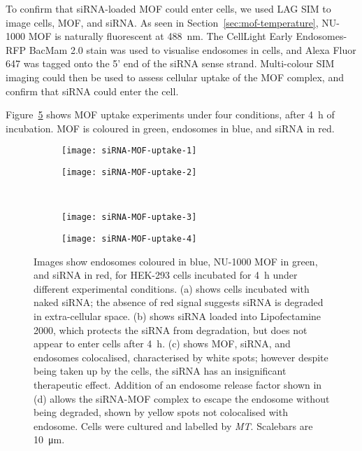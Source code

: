 To confirm that siRNA-loaded MOF could enter cells, we used LAG SIM to image cells, MOF, and siRNA. 
As seen in Section~\ref{sec:mof-temperature}, NU-1000 MOF is naturally fluorescent at \SI{488}{\nano\metre}. 
The CellLight Early Endosomes-RFP BacMam 2.0 stain was used to visualise endosomes in cells, and Alexa Fluor 647 was tagged onto the 5' end of the siRNA sense strand. 
Multi-colour SIM imaging could then be used to assess cellular uptake of the MOF complex, and confirm that siRNA could enter the cell. 

Figure~\ref{fig:siRNA-MOF-uptake} shows MOF uptake experiments under four conditions, after \SI{4}{\hour} of incubation. 
MOF is coloured in green, endosomes in blue, and siRNA in red. 


\begin{figure}[tbp]
\centering
\begin{subfigure}[b]{0.49\textwidth}
	\texttt{[image: siRNA-MOF-uptake-1]}
	\caption{}\label{fig:siRNA-MOF-uptake-1}
\end{subfigure}
\hfill
\begin{subfigure}[b]{0.49\textwidth}
	\texttt{[image: siRNA-MOF-uptake-2]}
	\caption{}\label{fig:siRNA-MOF-uptake-2}
\end{subfigure}

~\newline
\begin{subfigure}[b]{0.49\textwidth}
	\texttt{[image: siRNA-MOF-uptake-3]}
	\caption{}\label{fig:siRNA-MOF-uptake-3}
\end{subfigure}
\hfill
\begin{subfigure}[b]{0.49\textwidth}
	\texttt{[image: siRNA-MOF-uptake-4]}
	\caption{}\label{fig:siRNA-MOF-uptake-4}
\end{subfigure}
\caption[MOFs: siRNA-loaded NU-1000 is endocytosed by HEK-293 cells, and released to the cytoplasm with an endosome release factor]{Images show endosomes coloured in blue, NU-1000 MOF in green, and siRNA in red, for HEK-293 cells incubated for \SI{4}{\hour} under different experimental conditions. (a) shows cells incubated with naked siRNA; the absence of red signal suggests siRNA is degraded in extra-cellular space. (b) shows siRNA loaded into Lipofectamine 2000, which protects the siRNA from degradation, but does not appear to enter cells after \SI{4}{\hour}. (c) shows MOF, siRNA, and endosomes colocalised, characterised by white spots; however despite being taken up by the cells, the siRNA has an insignificant therapeutic effect. Addition of an endosome release factor shown in (d) allows the siRNA-MOF complex to escape the endosome without being degraded, shown by yellow spots not colocalised with endosome. Cells were cultured and labelled by \textit{MT}. Scalebars are \SI{10}{\micro\metre}. }
\label{fig:siRNA-MOF-uptake}
\end{figure}

